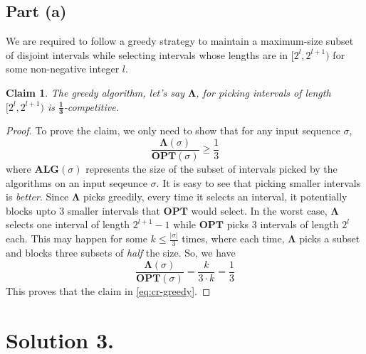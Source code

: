 \documentclass[11pt]{article}
\newtheorem{claim}{Claim}
\begin{document}
\subsection*{Part (a)}
We are required to follow a greedy strategy to maintain a maximum-size subset of disjoint
intervals while selecting intervals whose lengths are in $[2^{l}, 2^{l+1})$ for
some non-negative integer $l$.
\begin{claim}
    The greedy algorithm, let's say $\mathbf{\Lambda}$, for picking intervals of
    length $[2^{l}, 2^{l+1})$ is $\mathbf{\frac{1}{3}}$-competitive.
\end{claim}
\begin{proof}
    To prove the claim, we only need to show that for any input
    sequence $\sigma$,
    \begin{equation}
        \label{eq:cr-greedy}
        \frac{\mathbf{\Lambda}(\sigma)}{\mathbf{OPT}(\sigma)} \geq \frac{1}{3}
    \end{equation}
    where $\mathbf{ALG}(\sigma)$ represents the size of the subset of intervals picked by the algorithms
    on an input seqeunce $\sigma$.
    It is easy to see that picking smaller intervals is \textit{better}. Since $\mathbf{\Lambda}$
    picks greedily, every time it selects an interval, it potentially blocks upto 3 smaller intervals
    that $\mathbf{OPT}$ would select.
    In the worst case, $\mathbf{\Lambda}$ selects one interval of length $2^{l+1}-1$ while
    $\mathbf{OPT}$ picks 3 intervals of length $2^{l}$ each. This may happen for some $k \leq \frac{|\sigma|}{3}$ times, where each time,
    $\mathbf{\Lambda}$ picks a subset and blocks three subsets of \textit{half} the size. So, we have
    \begin{equation}
        \frac{\mathbf{\Lambda}(\sigma)}{\mathbf{OPT}(\sigma)} = \frac{k}{3 \cdot k} = \frac{1}{3}
    \end{equation}
    This proves that the claim in \eqref{eq:cr-greedy}.
\end{proof}


\section*{Solution 3.}
\end{document}
